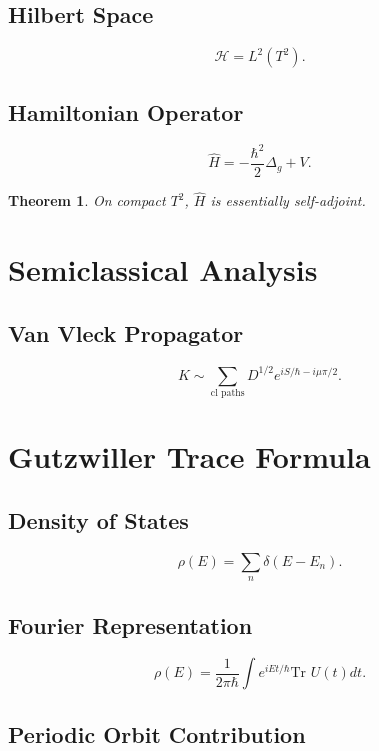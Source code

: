 \documentclass[11pt,oneside]{book}
\newtheorem{theorem}{Theorem}[chapter]
\begin{document}
\section{Hilbert Space}

\[
\mathcal H=L^2(T^2).
\]

\section{Hamiltonian Operator}

\[
\hat H=-\frac{\hbar^2}{2}\Delta_g+V.
\]

\begin{theorem}
On compact $T^2$, $\hat H$ is essentially self-adjoint.
\end{theorem}

\chapter{Semiclassical Analysis}

\section{Van Vleck Propagator}

\[
K\sim
\sum_{\text{cl paths}}
D^{1/2}
e^{iS/\hbar - i\mu\pi/2}.
\]

\chapter{Gutzwiller Trace Formula}

\section{Density of States}

\[
\rho(E)=\sum_n \delta(E-E_n).
\]

\section{Fourier Representation}

\[
\rho(E)
=
\frac1{2\pi\hbar}
\int e^{iEt/\hbar}
\text{Tr }U(t)dt.
\]

\section{Periodic Orbit Contribution}
\end{document}
